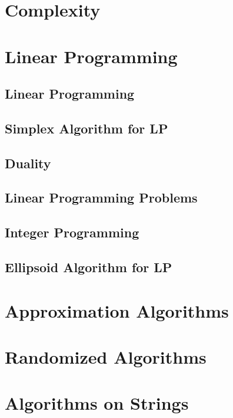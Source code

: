 \documentclass[11pt,fleqn,dvipsnames]{book} %
\begin{document}
\part{Complexity}

\part{Linear Programming}

\chapter{Linear Programming}


\chapter{Simplex Algorithm for LP}


\chapter{Duality}


\chapter{Linear Programming Problems}

\chapter{Integer Programming}

\chapter{Ellipsoid Algorithm for LP}

\part{Approximation Algorithms}

\part{Randomized Algorithms}

\part{Algorithms on Strings}
\end{document}
